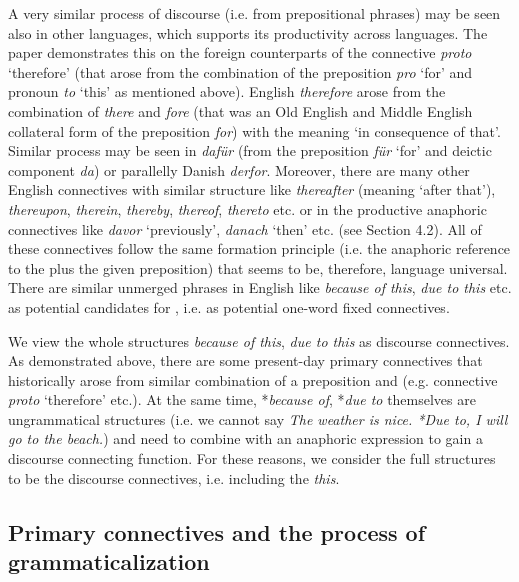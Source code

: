 \documentclass[output=paper]{langsci/langscibook.cls}
\begin{document}
A very similar process of discourse  (i.e. from prepositional phrases) may be seen also in other languages, which supports its productivity across languages. The paper demonstrates this on the foreign counterparts of the  connective \textit{proto }`therefore' (that arose from the combination of the preposition\textit{ pro} `for' and pronoun \textit{to} `this' as mentioned above). English \textit{therefore} arose from the combination of\textit{ there} and \textit{fore }(that was an Old English and Middle English collateral form of the preposition \textit{for}) with the meaning `in consequence of that'. Similar process may be seen in  \textit{dafür} (from the preposition \textit{für} `for' and deictic component \textit{da}) or parallelly Danish \textit{derfor}. Moreover, there are many other English connectives with similar structure like \textit{thereafter} (meaning `after that'),\textit{ thereupon}, \textit{therein}, \textit{thereby}, \textit{thereof}, \textit{thereto }etc. or in  the productive anaphoric connectives like\textit{ davor} `previously',\textit{ danach} `then' etc. (see Section 4.2). All of these connectives follow the same formation principle (i.e. the anaphoric reference to the  plus the given preposition) that seems to be, therefore, language universal. There are similar unmerged phrases in English like \textit{because of this}, \textit{due to this} etc. as potential candidates for , i.e. as potential one-word fixed connectives.


We view the whole structures \textit{because of this}, \textit{due to this} as discourse connectives. As demonstrated above, there are some present-day primary connectives that historically arose from similar combination of a preposition and  (e.g.  connective\textit{ proto} `therefore' etc.). At the same time, *\textit{because of}, *\textit{due to} themselves are ungrammatical structures (i.e. we cannot say \textit{The weather is nice. *Due to, I will go to the beach.}) and need to combine with an anaphoric expression to gain a discourse connecting function. For these reasons, we consider the full structures to be the discourse connectives, i.e. including the  \textit{this}.

\subsection{Primary connectives and the process of grammaticalization}
\end{document}
